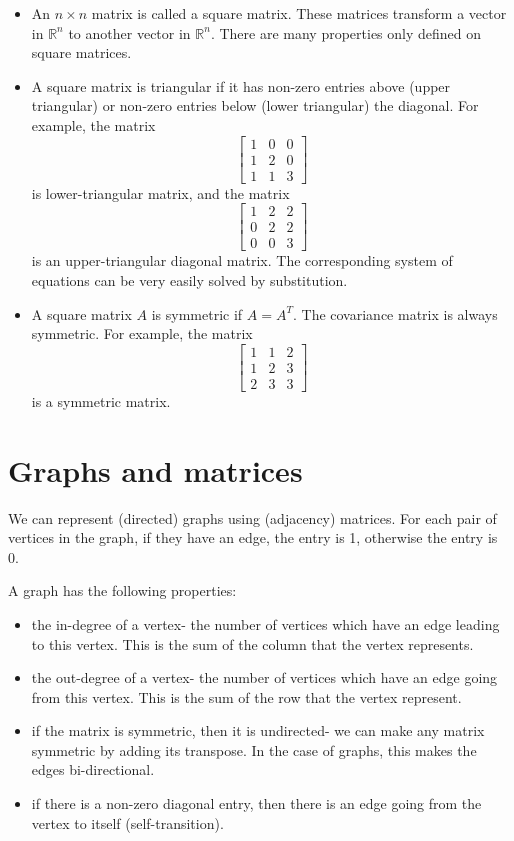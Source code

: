 \documentclass[a4paper, openany]{memoir}
\begin{document}
\begin{itemize}
        \item An $n \times n$ matrix is called a square matrix. These matrices transform a vector in $\mathbb{R}^n$ to another vector in $\mathbb{R}^n$. There are many properties only defined on square matrices.
    
        \item A square matrix is triangular if it has non-zero entries above (upper triangular) or non-zero entries below (lower triangular) the diagonal. For example, the matrix 
        \[\begin{bmatrix}
            1 & 0 & 0 \\
            1 & 2 & 0 \\
            1 & 1 & 3
        \end{bmatrix}\]
        is lower-triangular matrix, and the matrix 
        \[\begin{bmatrix}
            1 & 2 & 2 \\
            0 & 2 & 2 \\
            0 & 0 & 3
        \end{bmatrix}\]
        is an upper-triangular diagonal matrix. The corresponding system of equations can be very easily solved by substitution.
    
        \item A square matrix $A$ is symmetric if $A = A^T$. The covariance matrix is always symmetric. For example, the matrix 
        \[\begin{bmatrix}
            1 & 1 & 2 \\
            1 & 2 & 3 \\
            2 & 3 & 3
        \end{bmatrix}\]
        is a symmetric matrix.
    \end{itemize}

    \section{Graphs and matrices}
    We can represent (directed) graphs using (adjacency) matrices. For each pair of vertices in the graph, if they have an edge, the entry is 1, otherwise the entry is 0.

    A graph has the following properties:
    \begin{itemize}
        \item the in-degree of a vertex- the number of vertices which have an edge leading to this vertex. This is the sum of the column that the vertex represents.
        \item the out-degree of a vertex- the number of vertices which have an edge going from this vertex. This is the sum of the row that the vertex represent.
        \item if the matrix is symmetric, then it is undirected- we can make any matrix symmetric by adding its transpose. In the case of graphs, this makes the edges bi-directional.
        \item if there is a non-zero diagonal entry, then there is an edge going from the vertex to itself (self-transition).
    \end{itemize}
\end{document}
